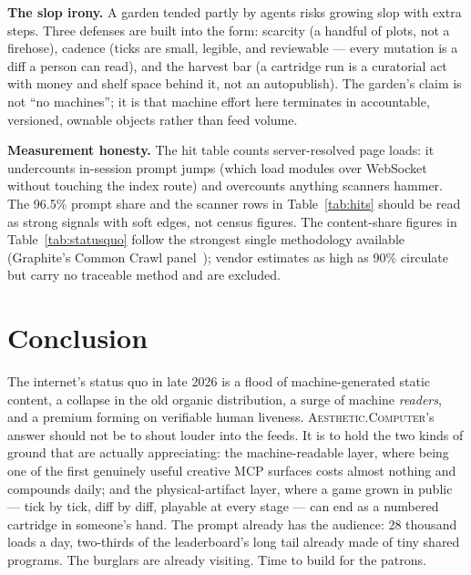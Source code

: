 \documentclass[10pt,letterpaper,twocolumn]{article}
\newcommand{\ac}{\textsc{Aesthetic.Computer}}
\begin{document}
\textbf{The slop irony.} A garden tended partly by agents risks growing slop with extra steps. Three defenses are built into the form: scarcity (a handful of plots, not a firehose), cadence (ticks are small, legible, and reviewable --- every mutation is a diff a person can read), and the harvest bar (a cartridge run is a curatorial act with money and shelf space behind it, not an autopublish). The garden's claim is not ``no machines''; it is that machine effort here terminates in accountable, versioned, ownable objects rather than feed volume.

\textbf{Measurement honesty.} The hit table counts server-resolved page loads: it undercounts in-session prompt jumps (which load modules over WebSocket without touching the index route) and overcounts anything scanners hammer. The 96.5\% prompt share and the scanner rows in Table~\ref{tab:hits} should be read as strong signals with soft edges, not census figures. The content-share figures in Table~\ref{tab:statusquo} follow the strongest single methodology available (Graphite's Common Crawl panel~\citep{graphite2026plateau}); vendor estimates as high as 90\% circulate but carry no traceable method and are excluded.

\section{Conclusion}

The internet's status quo in late 2026 is a flood of machine-generated static content, a collapse in the old organic distribution, a surge of machine \emph{readers}, and a premium forming on verifiable human liveness. \ac{}'s answer should not be to shout louder into the feeds. It is to hold the two kinds of ground that are actually appreciating: the machine-readable layer, where being one of the first genuinely useful creative MCP surfaces costs almost nothing and compounds daily; and the physical-artifact layer, where a game grown in public --- tick by tick, diff by diff, playable at every stage --- can end as a numbered cartridge in someone's hand. The prompt already has the audience: 28 thousand loads a day, two-thirds of the leaderboard's long tail already made of tiny shared programs. The burglars are already visiting. Time to build for the patrons.



\end{document}
